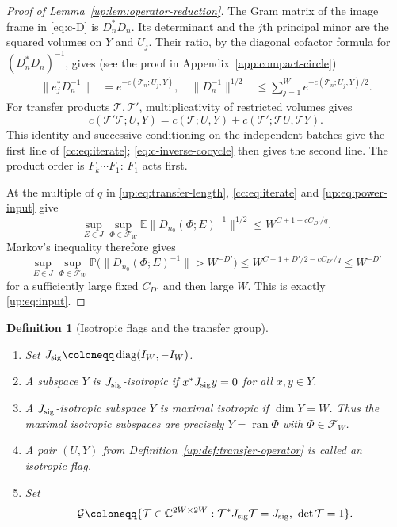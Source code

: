\documentclass[11pt]{article}
\numberwithin{equation}{section}
\newtheorem{definition}[theorem]{Definition}
\theoremstyle{remark}
\newcommand{\E}{\mathbb E}
\newcommand{\Prob}{\mathbb P}
\newcommand{\C}{\mathbb C}
\newcommand{\diag}{\operatorname{diag}}
\newcommand{\ran}{\operatorname{ran}}
\begin{document}
\begin{proof}[Proof of Lemma~\ref{up:lem:operator-reduction}]
The Gram matrix of the image frame in \eqref{eq:c-D} is $D_n^*D_n$. Its determinant
and the $j$th principal minor are the squared volumes on $Y$ and $U_j$.
Their ratio, by the diagonal cofactor formula for $(D_n^*D_n)^{-1}$,
gives (see the proof in Appendix~\ref{app:compact-circle})
\begin{equation}\label{eq:c-inverse-cocycle}
 \begin{aligned}
 \|e_j^*D_n^{-1}\|&=e^{-c(\mathcal T_n;U_j,Y)},\quad
 \|D_n^{-1}\|^{1/2}&\le\sum_{j=1}^W
     e^{-c(\mathcal T_n;U_j,Y)/2}.
 \end{aligned}
\end{equation}
For transfer products $\mathcal T,\mathcal T'$, multiplicativity of restricted volumes gives
\[
 c(\mathcal T'\mathcal T;U,Y)
 =c(\mathcal T;U,Y)+c(\mathcal T';\mathcal T U,\mathcal T Y).
\]
This identity and successive conditioning on the independent
batches give the first line of \eqref{cc:eq:iterate};
\eqref{eq:c-inverse-cocycle} then gives the second line. The product order is
$F_k\cdots F_1$: $F_1$ acts first.

At the multiple of $q$ in \eqref{up:eq:transfer-length},
\eqref{cc:eq:iterate} and \eqref{up:eq:power-input} give
\[
 \sup_{E\in J}\sup_{\Phi\in\mathcal F_W}
 \E\|D_{n_0}(\Phi;E)^{-1}\|^{1/2}
 \le W^{C+1-cC_{D'}/q}.
\]
Markov's inequality therefore gives
\[
 \sup_{E\in J}\sup_{\Phi\in\mathcal F_W}
 \Prob\bigl(\|D_{n_0}(\Phi;E)^{-1}\|>W^{-D'}\bigr)
 \le W^{C+1+D'/2-cC_{D'}/q}\le W^{-D'}
\]
for a sufficiently large fixed $C_{D'}$ and then large $W$.
This is exactly \eqref{up:eq:input}.
\end{proof}

\begin{definition}[Isotropic flags and the transfer group]
\label{up:def:isotropic-group}
\begin{enumerate}
\item[\textup{(i)}] Set $J_{\rm sig}\coloneqq\diag(I_W,-I_W)$.
\item[\textup{(ii)}] A subspace $Y$ is
\emph{$J_{\rm sig}$-isotropic} if $x^*J_{\rm sig}y=0$ for all $x,y\in Y$.
\item[\textup{(iii)}] A $J_{\rm sig}$-isotropic subspace $Y$ is
\emph{maximal isotropic} if $\dim Y=W$.
Thus the maximal isotropic subspaces are precisely $Y=\ran\Phi$
with $\Phi\in\mathcal F_W$.
\item[\textup{(iv)}] A pair $(U,Y)$ from
Definition~\ref{up:def:transfer-operator} is called an \emph{isotropic flag}.
\item[\textup{(v)}] Set
\begin{equation}\label{eq:c-group}
 \mathcal G\coloneqq
 \{\mathcal T\in\C^{2W\times2W}:\mathcal T^*J_{\rm sig}\mathcal T=J_{\rm sig},\ \det \mathcal T=1\}.
\end{equation}
\end{enumerate}
\end{definition}
\end{document}
